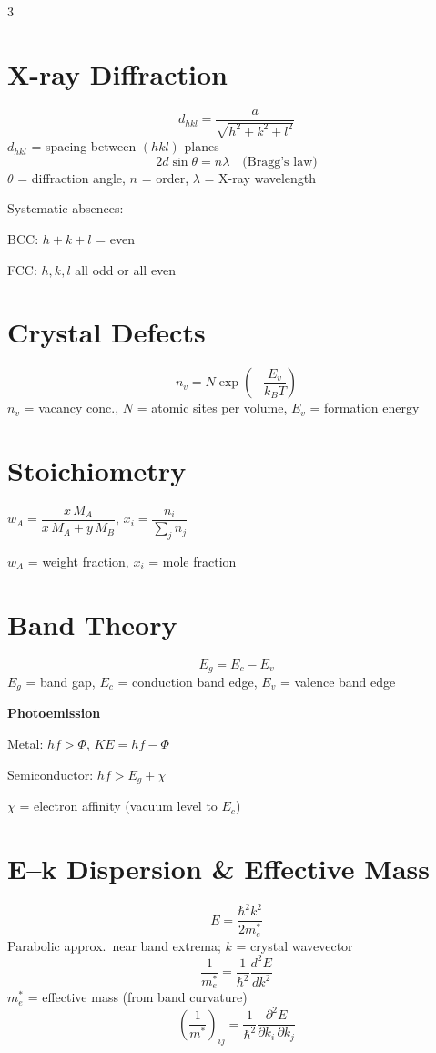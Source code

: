 \documentclass[9pt]{extarticle}
\newcommand{\eqlabel}[1]{\textbf{\scriptsize #1}\;}
\newcommand{\vardef}[1]{{\footnotesize\color{defgray}#1}}
\begin{document}
\begin{multicols}{3}
\section{X-ray Diffraction}
\[d_{hkl} = \frac{a}{\sqrt{h^2+k^2+l^2}}\]
\vardef{$d_{hkl}$ = spacing between $(hkl)$ planes}
\[2d\sin\theta = n\lambda \quad\text{(Bragg's law)}\]
\vardef{$\theta$ = diffraction angle, $n$ = order, $\lambda$ = X-ray wavelength}

Systematic absences:

BCC: $h\!+\!k\!+\!l$ = even

FCC: $h,k,l$ all odd or all even

\section{Crystal Defects}
\[n_v = N\exp\!\left(-\frac{E_v}{k_BT}\right)\]
\vardef{$n_v$ = vacancy conc., $N$ = atomic sites per volume, $E_v$ = formation energy}

\section{Stoichiometry}
$w_A = \dfrac{x\,M_A}{x\,M_A + y\,M_B}$, \quad $x_i = \dfrac{n_i}{\sum_j n_j}$

\vardef{$w_A$ = weight fraction, $x_i$ = mole fraction}

\section{Band Theory}
\[E_g = E_c - E_v\]
\vardef{$E_g$ = band gap, $E_c$ = conduction band edge, $E_v$ = valence band edge}

\eqlabel{Photoemission}

Metal: $hf > \Phi$, \; $KE = hf - \Phi$

Semiconductor: $hf > E_g + \chi$

\vardef{$\chi$ = electron affinity (vacuum level to $E_c$)}

\section{E--k Dispersion \& Effective Mass}
\[E = \frac{\hbar^2 k^2}{2m_e^*}\]
\vardef{Parabolic approx.\ near band extrema; $k$ = crystal wavevector}
\[\frac{1}{m_e^*} = \frac{1}{\hbar^2}\frac{d^2E}{dk^2}\]
\vardef{$m_e^*$ = effective mass (from band curvature)}
\[\left(\frac{1}{m^*}\right)_{ij} = \frac{1}{\hbar^2}\frac{\partial^2 E}{\partial k_i\,\partial k_j}\]


\end{multicols}
\end{document}
